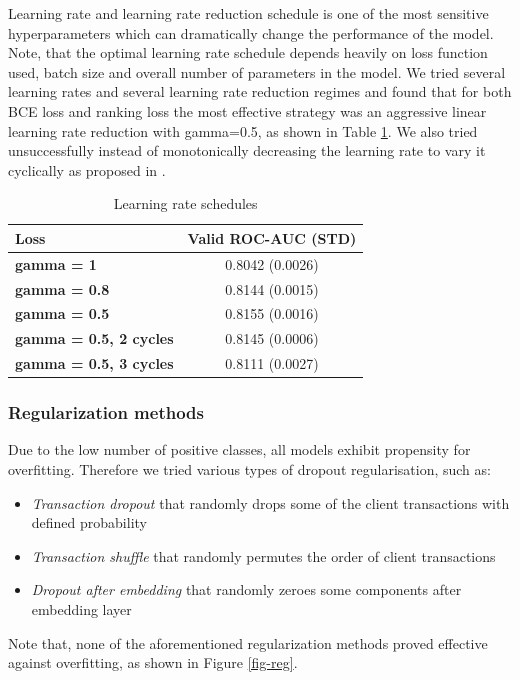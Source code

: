\documentclass[sigconf]{acmart}
\begin{document}
Learning rate and learning rate reduction schedule is one of the most sensitive hyperparameters which can dramatically change the performance of the model.
Note, that the optimal learning rate schedule depends heavily on loss function used, batch size and overall number of parameters in the model. 
We tried several learning rates and several learning rate reduction regimes and found that for both BCE loss and ranking loss the most effective strategy was an aggressive linear learning rate reduction with gamma=0.5, as shown in Table \ref{tab-lr}. We also tried unsuccessfully instead of monotonically decreasing the learning rate to vary it cyclically as proposed in \cite{smith2017cyclical}.

\begin{table}[ht]
\caption{Learning rate schedules}
\begin{tabular}{ | l | c |  }
\hline
\textbf{Loss} & \textbf{Valid ROC-AUC (STD)} \\
\hline
\textbf{gamma = 1} & 0.8042 (0.0026)  \\
\textbf{gamma = 0.8} & 0.8144 (0.0015)  \\
\textbf{gamma = 0.5} & 0.8155 (0.0016)  \\
\textbf{gamma = 0.5, 2 cycles} & 0.8145 (0.0006)  \\
\textbf{gamma = 0.5, 3 cycles} & 0.8111 (0.0027)  \\
\hline
\end{tabular}
\label{tab-lr}
\end{table}

\subsubsection{Regularization methods}

Due to the low number of positive classes, all models exhibit propensity for overfitting. Therefore we tried various types of dropout regularisation, such as:
\begin{itemize}
\item \textit{Transaction dropout} that randomly drops some of the client transactions with defined probability
\item \textit{Transaction shuffle} that randomly permutes the order of client transactions
\item \textit{Dropout after embedding} that randomly zeroes some components after embedding layer
\end{itemize}
Note that, none of the aforementioned regularization methods proved effective against overfitting, as shown in Figure \ref{fig-reg}.
\end{document}
